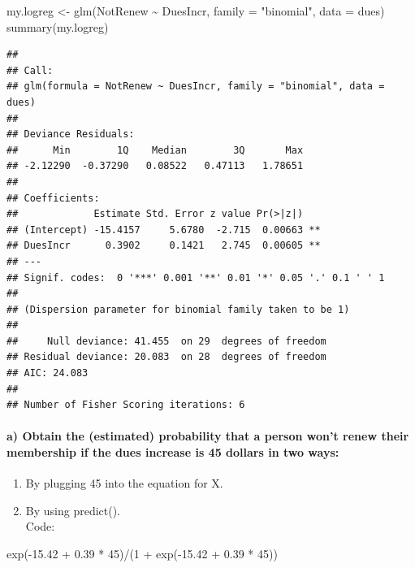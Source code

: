 \documentclass[
]{article}
\newenvironment{Shaded}{\begin{snugshade}}{\end{snugshade}}
\newcommand{\AttributeTok}[1]{\textcolor[rgb]{0.77,0.63,0.00}{#1}}
\newcommand{\DecValTok}[1]{\textcolor[rgb]{0.00,0.00,0.81}{#1}}
\newcommand{\FloatTok}[1]{\textcolor[rgb]{0.00,0.00,0.81}{#1}}
\newcommand{\FunctionTok}[1]{\textcolor[rgb]{0.00,0.00,0.00}{#1}}
\newcommand{\NormalTok}[1]{#1}
\newcommand{\OtherTok}[1]{\textcolor[rgb]{0.56,0.35,0.01}{#1}}
\newcommand{\SpecialCharTok}[1]{\textcolor[rgb]{0.00,0.00,0.00}{#1}}
\newcommand{\StringTok}[1]{\textcolor[rgb]{0.31,0.60,0.02}{#1}}
\providecommand{\tightlist}{%
  \setlength{\itemsep}{0pt}\setlength{\parskip}{0pt}}
\begin{document}
\begin{Shaded}
\begin{Highlighting}[]
\NormalTok{my.logreg }\OtherTok{\textless{}{-}}
  \FunctionTok{glm}\NormalTok{(NotRenew }\SpecialCharTok{\textasciitilde{}}\NormalTok{ DuesIncr, }\AttributeTok{family =} \StringTok{"binomial"}\NormalTok{, }\AttributeTok{data =}\NormalTok{ dues)}
\FunctionTok{summary}\NormalTok{(my.logreg)}
\end{Highlighting}
\end{Shaded}

\begin{verbatim}
## 
## Call:
## glm(formula = NotRenew ~ DuesIncr, family = "binomial", data = dues)
## 
## Deviance Residuals: 
##      Min        1Q    Median        3Q       Max  
## -2.12290  -0.37290   0.08522   0.47113   1.78651  
## 
## Coefficients:
##             Estimate Std. Error z value Pr(>|z|)   
## (Intercept) -15.4157     5.6780  -2.715  0.00663 **
## DuesIncr      0.3902     0.1421   2.745  0.00605 **
## ---
## Signif. codes:  0 '***' 0.001 '**' 0.01 '*' 0.05 '.' 0.1 ' ' 1
## 
## (Dispersion parameter for binomial family taken to be 1)
## 
##     Null deviance: 41.455  on 29  degrees of freedom
## Residual deviance: 20.083  on 28  degrees of freedom
## AIC: 24.083
## 
## Number of Fisher Scoring iterations: 6
\end{verbatim}

\hypertarget{a-obtain-the-estimated-probability-that-a-person-wont-renew-their-membership-if-the-dues-increase-is-45-dollars-in-two-ways}{%
\paragraph{a) Obtain the (estimated) probability that a person won't
renew their membership if the dues increase is 45 dollars in two
ways:}\label{a-obtain-the-estimated-probability-that-a-person-wont-renew-their-membership-if-the-dues-increase-is-45-dollars-in-two-ways}}

\begin{enumerate}
\def\labelenumi{\arabic{enumi}.}
\tightlist
\item
  By plugging 45 into the equation for X.
\item
  By using predict().\\
  Code:
\end{enumerate}

\begin{Shaded}
\begin{Highlighting}[]
\FunctionTok{exp}\NormalTok{(}\SpecialCharTok{{-}}\FloatTok{15.42} \SpecialCharTok{+} \FloatTok{0.39} \SpecialCharTok{*} \DecValTok{45}\NormalTok{)}\SpecialCharTok{/}\NormalTok{(}\DecValTok{1} \SpecialCharTok{+} \FunctionTok{exp}\NormalTok{(}\SpecialCharTok{{-}}\FloatTok{15.42} \SpecialCharTok{+} \FloatTok{0.39} \SpecialCharTok{*} \DecValTok{45}\NormalTok{))}
\end{Highlighting}
\end{Shaded}
\end{document}
